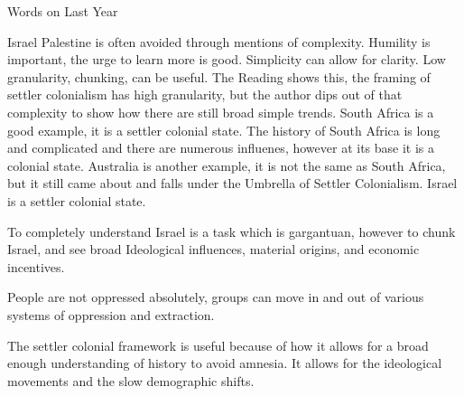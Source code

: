 \documentclass{report}
\begin{document}
\begin{description}
    \item {\Large Words on Last Year} 
        
        \begin{center}
        \end{center}

        Israel Palestine is often avoided through
        mentions of complexity. Humility is important,
        the urge to learn more is good. Simplicity can allow
        for clarity. Low granularity, chunking, can be useful.
        The Reading shows this, the framing of settler colonialism
        has high granularity, but the author dips out of that
        complexity to show how there are still broad simple
        trends.
        South Africa is a good example, it is a settler colonial
        state. The history of South Africa is long and complicated
        and there are numerous influenes, however at its base
        it is a colonial state.
        Australia is another example, it is not the same as South
        Africa, but it still came about and falls under the Umbrella
        of Settler Colonialism.
        Israel is a settler colonial state. 

        To completely understand Israel is a task which is gargantuan,
        however to chunk Israel, and see broad Ideological influences,
        material origins, and economic incentives.

        People are not oppressed absolutely, groups can move in and
        out of various systems of oppression and extraction.

        The settler colonial framework is useful because of how it
        allows for a broad enough understanding of history to avoid
        amnesia. It allows for the ideological movements and the
        slow demographic shifts.


\end{description}
\end{document}
